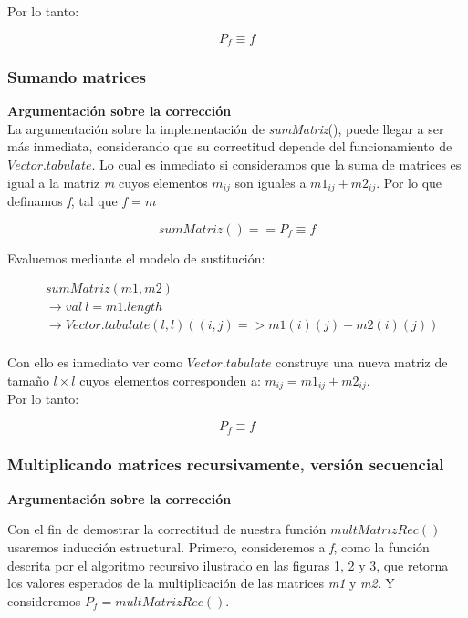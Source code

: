 \documentclass{article}
\begin{document}
Por lo tanto:

\begin{equation*}
    P_f \equiv f
\end{equation*}

\subsubsection{Sumando matrices}

\textbf{Argumentación sobre la corrección}\\

La argumentación sobre la implementación de \textit{sumMatriz}(), puede llegar a ser más inmediata, considerando que su correctitud depende del funcionamiento de \(Vector.tabulate\). Lo cual es inmediato si consideramos que la suma de matrices es igual a la matriz \textit{m} cuyos elementos \(m_{ij}\) son iguales a \(m1_{ij} + m2_{ij}\). Por lo que definamos \textit{f}, tal que \(f = m\)

\begin{equation*}
    sumMatriz() == P_f \equiv f
\end{equation*}

Evaluemos mediante el modelo de sustitución:

\begin{align*}
    &sumMatriz(m1, m2)\\
    &\rightarrow val \ l = m1.length\\
    &\rightarrow Vector.tabulate(l,l)((i,j) => m1(i)(j)+m2(i)(j))\\
\end{align*}

Con ello es inmediato ver como \(Vector.tabulate\) construye una nueva matriz de tamaño \(l \times l\) cuyos elementos corresponden a: \(m_{ij} = m1_{ij} + m2_{ij}\).\\

Por lo tanto:

\begin{equation*}
    P_f \equiv f
\end{equation*}

\subsubsection{Multiplicando matrices recursivamente, versión secuencial}

\textbf{Argumentación sobre la corrección}

Con el fin de demostrar la correctitud de nuestra función \(multMatrizRec()\) usaremos inducción estructural. Primero, consideremos a \textit{f}, como la función descrita por el algoritmo recursivo ilustrado en las figuras 1, 2 y 3, que retorna los valores esperados de la multiplicación de las matrices \textit{m1} y \textit{m2}. Y consideremos \(P_f = multMatrizRec()\).\\
\end{document}
